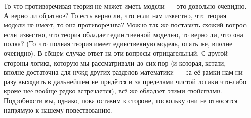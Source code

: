 То что противоречивая теория не может иметь модели~--- это довольно очевидно. А верно ли обратное? То есть верно ли, что если нам известно, что теория модели не имеет, то она противоречива? Можно так же поставить схожий вопрос: если известно, что теория обладает единственной моделью, то верно ли, что она полна? (То что полная теория имеет единственную модель, опять же, вполне очевидно). В общем случае ответ на эти вопросы отрицательный. С другой стороны логика, которую мы рассматривали до сих пор (и которая, кстати, вполне достаточна для нужд других разделов математики~--- за её рамки нам ни разу выходить в дальнейшем не придётся и за пределами чистой логики что-либо кроме неё вообще редко встречается), всё же обладает этими свойствами. Подробности мы, однако, пока оставим в стороне, поскольку они не относятся напрямую к нашему повествованию.